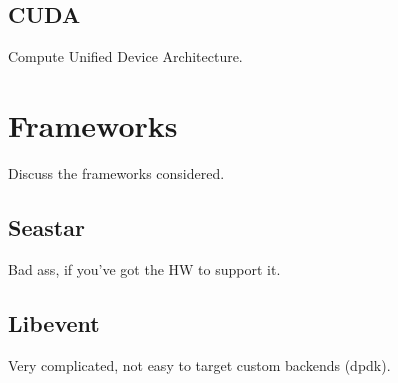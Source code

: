 \subsection{CUDA}
\label{related:hcp:cuda}
Compute Unified Device Architecture.

\section{Frameworks}
\label{related:frameworks}
Discuss the frameworks considered.

\subsection{Seastar}
\label{related:frameworks:seastar}
Bad ass, if you've got the HW to support it.

\subsection{Libevent}
\label{related:frameworks:libevent}
Very complicated, not easy to target custom backends (dpdk).
